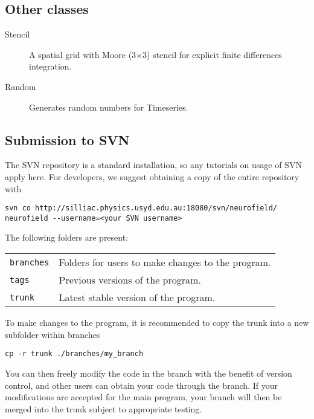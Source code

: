 \documentclass[12pt,a4paper]{article}
\newcommand{\type}[1]{ {\small\small\tt #1} }
\begin{document}
\subsection{Other classes}

\begin{description}
\item[Stencil] A spatial grid with Moore (3\(\times\)3) stencil for explicit finite differences integration.
\item[Random] Generates random numbers for Timeseries.
\end{description}

\subsection{Submission to SVN}
The SVN repository is a standard installation, so any tutorials on usage of SVN apply here. For developers, we suggest obtaining a copy of the entire repository with

\begin{lstlisting}
svn co http://silliac.physics.usyd.edu.au:18080/svn/neurofield/ neurofield --username=<your SVN username>
\end{lstlisting}
	
The following folders are present:

\begin{tabular}{l p{12cm}}
\type{branches}& Folders for users to make changes to the program.\\
\type{tags}& Previous versions of the program.\\
\type{trunk}& Latest stable version of the program.\\
\end{tabular}

To make changes to the program, it is recommended to copy the trunk into a new subfolder within branches

\begin{lstlisting}
cp -r trunk ./branches/my_branch
\end{lstlisting}
	
You can then freely modify the code in the branch with the benefit of version control, and other users can obtain your code through the branch. If your modifications are accepted for the main program, your branch will then be merged into the trunk subject to appropriate testing.
\end{document}
